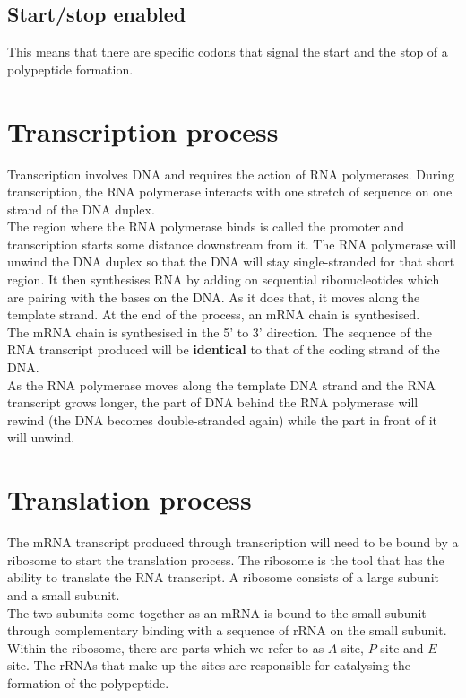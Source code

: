 \documentclass[11pt]{article}
\begin{document}
\subsection{Start/stop enabled}
\label{sec:orgb100ae9}
This means that there are specific codons that signal the start and the stop of a polypeptide formation.

\newpage

\section{Transcription process}
\label{sec:org7b44ad3}
Transcription involves DNA and requires the action of RNA polymerases. During transcription, the RNA polymerase interacts with one stretch of sequence on one strand of the DNA duplex.
\\[0pt]

The region where the RNA polymerase binds is called the promoter and transcription starts some distance downstream from it. The RNA polymerase will unwind the DNA duplex so that the DNA will stay single-stranded for that short region. It then synthesises RNA by adding on sequential ribonucleotides which are pairing with the bases on the DNA. As it does that, it moves along the template strand. At the end of the process, an mRNA chain is synthesised.
\\[0pt]

The mRNA chain is synthesised in the 5' to 3' direction. The sequence of the RNA transcript produced will be \textbf{identical} to that of the coding strand of the DNA.
\\[0pt]

As the RNA polymerase moves along the template DNA strand and the RNA transcript grows longer, the part of DNA behind the RNA polymerase will rewind (the DNA becomes double-stranded again) while the part in front of it will unwind.

\newpage

\section{Translation process}
\label{sec:org30ad343}
The mRNA transcript produced through transcription will need to be bound by a ribosome to start the translation process. The ribosome is the tool that has the ability to translate the RNA transcript. A ribosome consists of a large subunit and a small subunit.
\\[0pt]

The two subunits come together as an mRNA is bound to the small subunit through complementary binding with a sequence of rRNA on the small subunit. Within the ribosome, there are parts which we refer to as \(A\) site, \(P\) site and \(E\) site. The rRNAs that make up the sites are responsible for catalysing the formation of the polypeptide.
\\[0pt]
\end{document}
